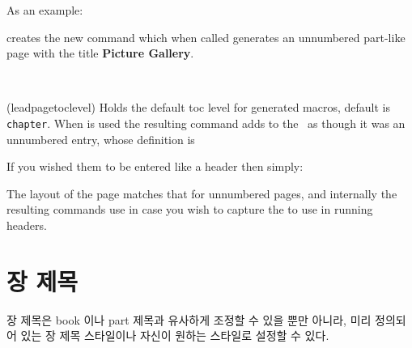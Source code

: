 As an example:
\begin{lcode}
\end{lcode}
creates the new command  which when called generates an unnumbered
part-like page with the title \textbf{Picture Gallery}.

\begin{syntax}
\cmd{\leadpagetoclevel} \\
\end{syntax}
\glossary(leadpagetoclevel)%
{}%
{Holds the default toc level for  generated macros,
default is \texttt{chapter}.}
When  is used the resulting command adds 
to the \toc\ as though it was an unnumbered \cmd{\leadpagetoclevel} entry,
whose definition is
\begin{lcode}
\newcommand*{\leadpagetoclevel}{chapter}
\end{lcode}
If you wished them to be entered like a \cmd{\part} header then simply:
\begin{lcode}
\renewcommand*{\leadpagetoclevel}{part}
\end{lcode}


    The layout of the page matches that for unnumbered \cmd{\part} pages, and
internally the resulting commands use \cmd{\partmark} in case you
wish to capture the  to use in running headers.


\section{장 제목}
\label{sec:chapter-headings}


장 제목은 book 이나 part 제목과 유사하게 조정할 수 있을 뿐만 아니라,
미리 정의되어 있는 장 제목 스타일이나 자신이 원하는 스타일로 설정할 수 있다.


